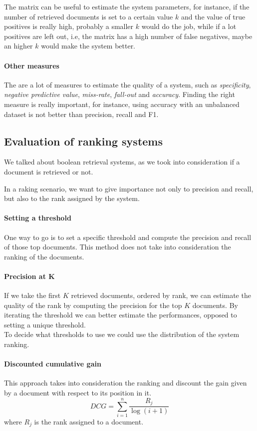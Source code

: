 The matrix can be useful to estimate the system parameters, for instance, 
if the number of retrieved documents is set to a certain value $k$ and 
the value of true positives is really high, probably a smaller $k$ would do the job, 
while if a lot positives are left out, i.e, the matrix has a high number of
false negatives, maybe an higher $k$ would make the system better.

\paragraph{Other measures}
The are a lot of measures to estimate the quality of a system, such as 
\emph{specificity}, \emph{negative predictive value}, \emph{miss-rate}, 
\emph{fall-out} and \emph{accuracy}. 
Finding the right measure is really important, for instance, using accuracy with
an unbalanced dataset is not better than precision, recall and F1.

\subsection{Evaluation of ranking systems}
We talked about boolean retrieval systems, as we took into consideration 
if a document is retrieved or not.

In a raking scenario, we want to give importance not only to precision and recall, 
but also to the rank assigned by the system.

\paragraph{Setting a threshold}
One way to go is to set a specific threshold and compute the precision and recall 
of those top documents.
This method does not take into consideration the ranking of the documents.

\paragraph{Precision at K}
If we take the first $K$ retrieved documents, ordered by rank, we can estimate 
the quality of the rank by computing the precision for the top $K$ documents.
By iterating the threshold we can better estimate the performances, opposed to 
setting a unique threshold.\\
To decide what thresholds to use we could use the distribution of the system ranking.

\paragraph{Discounted cumulative gain}
This approach takes into consideration the ranking and discount the gain given by
a document with respect to its position in it.
$$\mathit{DCG} = \sum_{i = 1}^n\frac{R_j}{\log(i+1)}$$
where $R_j$ is the rank assigned to a document.

